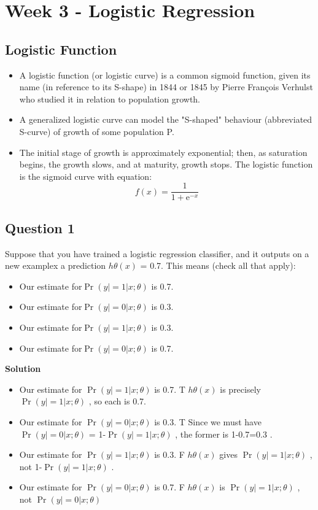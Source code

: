 	\section{Week 3 - Logistic Regression}
	
	\subsection{Logistic Function}
	\begin{itemize}
		\item A logistic function (or logistic curve) is a common sigmoid function, given its name (in reference to its S-shape) in 1844 or 1845 by Pierre François Verhulst who studied it in relation to population growth. 
		
		\item A generalized logistic curve can model the "S-shaped" behaviour (abbreviated S-curve) of growth of some population P. 
		
		\item The initial stage of growth is approximately exponential; then, as saturation begins, the growth slows, and at maturity, growth stops.
		The logistic function is the sigmoid curve with equation:
		\[ f(x) = \frac{1}{1 + \mathrm e^{-x}} \]
		
	\end{itemize}
	
	
\subsection{Question 1}

Suppose that you have trained a logistic regression classifier, and it outputs on a new examplex a prediction $h\theta(x)$ = 0.7.
This means (check all that apply): 
\begin{itemize}
	\item Our estimate for$ \Pr(y|=1|x;\theta)$ is 0.7.
	\item Our estimate for$ \Pr(y|=0|x;\theta)$ is 0.3.
	\item Our estimate for$ \Pr(y|=1|x;\theta)$ is 0.3.
	\item Our estimate for$ \Pr(y|=0|x;\theta)$ is 0.7.
\end{itemize}


\textbf{Solution} 
\begin{itemize}
\item Our estimate for $ \Pr(y|=1|x;\theta)$ is 0.7.  T
$h\theta(x)$ is precisely$ \Pr(y|=1|x;\theta)$ , so each is 0.7.
\item Our estimate for $ \Pr(y|=0|x;\theta)$ is 0.3.  
T Since we must have $ \Pr(y|=0|x;\theta)$ = 1-$ \Pr(y|=1|x;\theta)$ , the former is 1-0.7=0.3 .
\item Our estimate for $ \Pr(y|=1|x;\theta)$ is 0.3.  
F $h\theta(x)$ gives $ \Pr(y|=1|x;\theta)$ , not 1-$ \Pr(y|=1|x;\theta)$ . 
\item Our estimate for $ \Pr(y|=0|x;\theta)$ is 0.7.  
F $h\theta(x)$ is $ \Pr(y|=1|x;\theta)$ , not $ \Pr(y|=0|x;\theta)$
\end{itemize}
 

